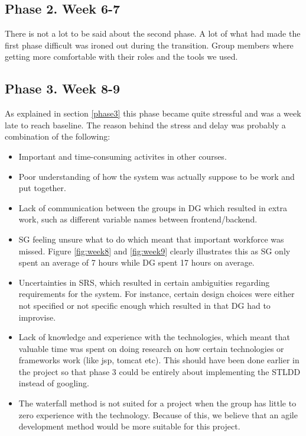 \documentclass{article}
\begin{document}
    \subsection{Phase 2. Week 6-7}
        There is not a lot to be said about the second phase. A lot of what had made the first phase difficult 
        was ironed out during the transition. Group members where getting more comfortable with their roles and 
        the tools we used. 
        
    \subsection{Phase 3. Week 8-9 \label{analys_phase3}}
        As explained in section \ref{phase3} this phase became quite stressful and 
        was a week late to reach baseline. The reason behind the stress and delay was
        probably a combination of the following:
        \begin{itemize}
            \item Important and time-consuming activites in other courses.
            \item Poor understanding of how the system was actually suppose to be work and
                    put together.
            \item Lack of communication between the groups in DG which resulted in 
                    extra work, such as different variable names between frontend/backend.
            \item SG feeling unsure what to do which meant that important workforce was missed.
                    Figure \ref{fig:week8} and \ref{fig:week9} clearly illustrates this as
                    SG only spent an average of 7 hours while DG spent 17 hours on average.
            \item Uncertainties in SRS, which resulted in certain ambiguities regarding requirements for the 
                    system. For instance, certain design choices were either not specified or not
                    specific enough which resulted in that DG had to improvise.
            \item Lack of knowledge and experience with the technologies, which meant that valuable time
                    was spent on doing research on how certain technologies or frameworks work (like jsp, tomcat etc). This should have been done earlier in the project so that phase 3 could
                    be entirely about implementing the STLDD instead of googling.
            \item The waterfall method is not suited for a project when the group has little to zero          experience with the technology. Because of this, we believe that an agile development         method would be more suitable for this project.
        \end{itemize}
    
\end{document}
